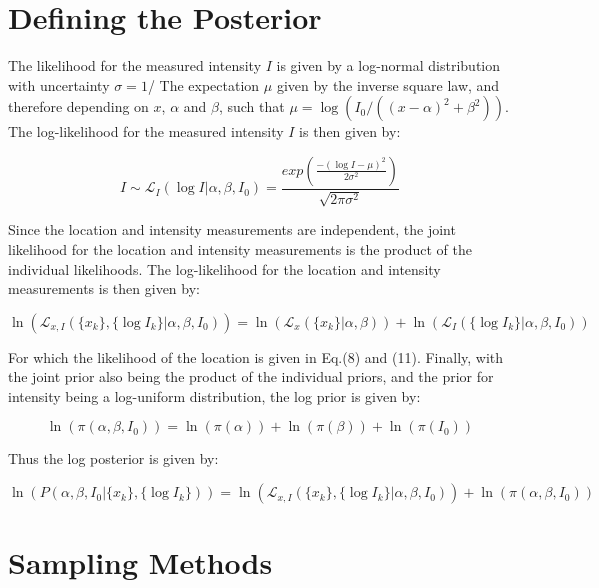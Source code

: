 \documentclass[12pt]{report} %
\begin{document}
\section{Defining the Posterior}

The likelihood for the measured intensity $I$ is given by a log-normal distribution with uncertainty $\sigma = 1$/ The expectation $\mu$ given by the inverse square law, and therefore depending on $x$, $\alpha$ and $\beta$, such that $\mu = \log(I_{0}/((x - \alpha)^{2} + \beta^{2}))$. The log-likelihood for the measured intensity $I$ is then given by:

\begin{equation}
    I \sim \mathcal{L}_{I}(\log I | \alpha, \beta, I_{0}) = \frac{exp(\frac{-(\log I - \mu)^{2}}{2\sigma^{2}})}{\sqrt{2\pi\sigma^{2}}}
\end{equation}

Since the location and intensity measurements are independent, the joint likelihood for the location and intensity measurements is the product of the individual likelihoods. The log-likelihood for the location and intensity measurements is then given by:

\begin{equation}
    \ln(\mathcal{L}_{x, I}(\{x_{k}\}, \{\log I_{k}\} | \alpha, \beta, I_{0})) = \ln(\mathcal{L}_{x}(\{x_{k}\} | \alpha, \beta)) + \ln(\mathcal{L}_{I}(\{\log I_{k}\} | \alpha, \beta, I_{0}))
\end{equation}

For which the likelihood of the location is given in Eq.(8) and (11). Finally, with the joint prior also being the product of the individual priors, and the prior for intensity being a log-uniform distribution, the log prior is given by:

\begin{equation}
    \ln(\pi(\alpha, \beta, I_{0})) = \ln(\pi(\alpha)) + \ln(\pi(\beta)) + \ln(\pi(I_{0}))
\end{equation}

Thus the log posterior is given by:

\begin{equation}
    \ln(P(\alpha, \beta, I_{0} | \{x_{k}\}, \{\log I_{k}\})) = \ln(\mathcal{L}_{x, I}(\{x_{k}\}, \{\log I_{k}\} | \alpha, \beta, I_{0})) + \ln(\pi(\alpha, \beta, I_{0}))
\end{equation}

\section{Sampling Methods}
\end{document}
